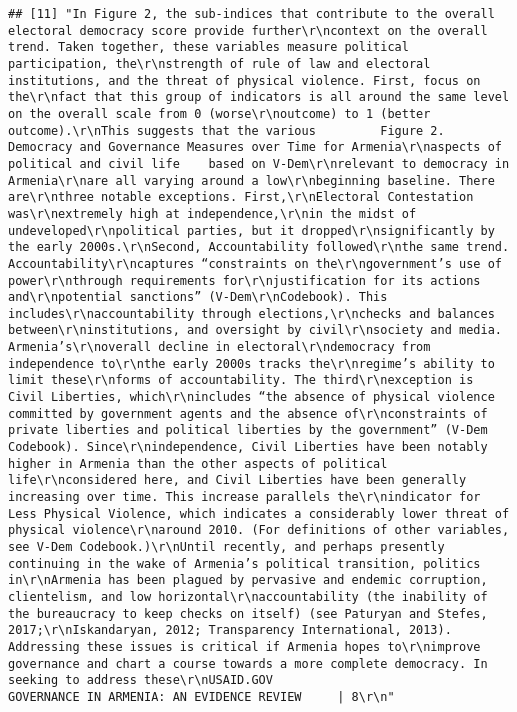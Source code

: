 \documentclass[
]{article}
\begin{document}
\begin{verbatim}
## [11] "In Figure 2, the sub-indices that contribute to the overall electoral democracy score provide further\r\ncontext on the overall trend. Taken together, these variables measure political participation, the\r\nstrength of rule of law and electoral institutions, and the threat of physical violence. First, focus on the\r\nfact that this group of indicators is all around the same level on the overall scale from 0 (worse\r\noutcome) to 1 (better outcome).\r\nThis suggests that the various         Figure 2. Democracy and Governance Measures over Time for Armenia\r\naspects of political and civil life    based on V-Dem\r\nrelevant to democracy in Armenia\r\nare all varying around a low\r\nbeginning baseline. There are\r\nthree notable exceptions. First,\r\nElectoral Contestation was\r\nextremely high at independence,\r\nin the midst of undeveloped\r\npolitical parties, but it dropped\r\nsignificantly by the early 2000s.\r\nSecond, Accountability followed\r\nthe same trend. Accountability\r\ncaptures “constraints on the\r\ngovernment’s use of power\r\nthrough requirements for\r\njustification for its actions and\r\npotential sanctions” (V-Dem\r\nCodebook). This includes\r\naccountability through elections,\r\nchecks and balances between\r\ninstitutions, and oversight by civil\r\nsociety and media. Armenia’s\r\noverall decline in electoral\r\ndemocracy from independence to\r\nthe early 2000s tracks the\r\nregime’s ability to limit these\r\nforms of accountability. The third\r\nexception is Civil Liberties, which\r\nincludes “the absence of physical violence committed by government agents and the absence of\r\nconstraints of private liberties and political liberties by the government” (V-Dem Codebook). Since\r\nindependence, Civil Liberties have been notably higher in Armenia than the other aspects of political life\r\nconsidered here, and Civil Liberties have been generally increasing over time. This increase parallels the\r\nindicator for Less Physical Violence, which indicates a considerably lower threat of physical violence\r\naround 2010. (For definitions of other variables, see V-Dem Codebook.)\r\nUntil recently, and perhaps presently continuing in the wake of Armenia’s political transition, politics in\r\nArmenia has been plagued by pervasive and endemic corruption, clientelism, and low horizontal\r\naccountability (the inability of the bureaucracy to keep checks on itself) (see Paturyan and Stefes, 2017;\r\nIskandaryan, 2012; Transparency International, 2013). Addressing these issues is critical if Armenia hopes to\r\nimprove governance and chart a course towards a more complete democracy. In seeking to address these\r\nUSAID.GOV                                                     GOVERNANCE IN ARMENIA: AN EVIDENCE REVIEW     | 8\r\n"                                                                                                                                                                                                                                                                                                                                                                                                                                                                                                                                                  
\end{verbatim}
\end{document}
